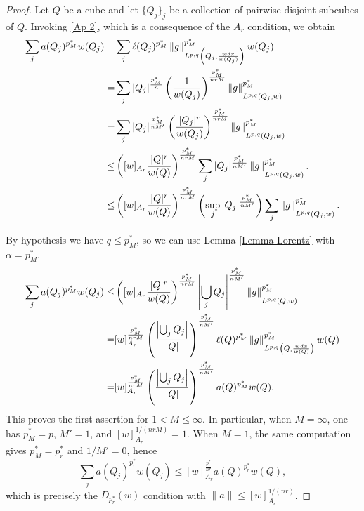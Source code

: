 \documentclass[reqno, 10pt, oneside]{amsart}
\numberwithin{equation}{section}
\newcommand{\strt}[1]{\rule{0pt}{#1}}
\numberwithin{theorem}{section}
\newcommand{\1}{{\rm 1\hspace*{-0.4ex}%
\rule{0.1ex}{1.52ex}\hspace*{0.2ex}}}
\begin{document}
\begin{proof}
Let $Q$ be a cube and let $\{Q_j\}_j$ be a collection of pairwise disjoint subcubes of $Q$. Invoking \eqref{Ap 2}, which is a consequence of the $A_r$ condition, we obtain
		\begin{align*}
			\sum_j a(Q_j)^{p_{M}^*} w(Q_j)  = & \sum_j \ell(Q_j)^{p_{M}^*} \left\| g \right\|_{L^{p,q} \left( Q_j, \frac{wdx}{w(Q_j)}\right)} ^{p_{M}^*} w(Q_j) \\
			= & \sum_j |Q_j|^\frac{p_{M}^*}{n} \left(\frac{1}{w(Q_j)} \right)^{\frac{p_{M}^*}{nrM}} \left\| g \right\|_{\strt{2.3ex} L^{p,q} \left( Q_j, w\right)} ^{p_{M}^*}  \\
			= & \sum_j |Q_j|^{\frac{p_{M}^*}{n M'}}\left(\frac{|Q_j|^r}{w(Q_j)} \right)^{\frac{p_{M}^*}{nrM}} \left\| g \right\|_{\strt{2.3ex} L^{p,q} \left( Q_j, w\right)} ^{p_{M}^*}  \\
			\le & \left([w]_{A_r}\frac{|Q|^r}{w(Q)} \right)^{\frac{p_M^{*}}{nrM}} \sum_j |Q_j|^{\frac{p_{M}^*}{n M'}}\left\| g \right\|_{\strt{2.3ex} L^{p,q} \left( Q_j, w\right)} ^{p_{M}^*}. \\
            \le & \left([w]_{A_r}\frac{|Q|^r}{w(Q)} \right)^{\frac{p_M^{*}}{nrM}} \left( \sup_j |Q_j|^{\frac{p_{M}^*}{n M'}}\right) \sum_j \left\| g \right\|_{\strt{2.3ex} L^{p,q} \left( Q_j, w\right)} ^{p_{M}^*}.
		\end{align*}
		
		By hypothesis we have $q\le p^*_M$, so we can use Lemma \ref{Lemma Lorentz} with $\alpha=p^*_M$,
		\begin{align*}
			\sum_j a(Q_j)^{p_{M}^*} w(Q_j)  \le & \left([w]_{A_r}\frac{|Q|^r}{w(Q)} \right)^{\frac{p_M^{*}}{nrM}} \left| \bigcup_j Q_j\right|^{\frac{p_M^{*}}{n M'}}   \left\| g \right\|_{\strt{2.3ex}L^{p,q} \left( Q, w\right)} ^{p_M^{*}}  \\
			= & [w]_{A_r}^{\frac{p_M^{*}}{nrM}}  \left( \frac{\left| \bigcup_j Q_j\right|}{|Q|} \right)^{\frac{p_M^{*}}{n M'}} \ell(Q)^{p_M^{*}} \left\| g \right\|_{\strt{2.3ex}L^{p,q} \left( Q, \frac{wdx}{w(Q)}\right)}^{p_M^{*}} w(Q)  \\
			= &  [w]_{A_r}^{\frac{p_{M}^*}{nrM}}  \left( \frac{\left| \bigcup_j Q_j\right|}{|Q|} \right)^{\frac{p_{M}^*}{n M'}} a(Q)^{p_{M}^*} w(Q).
		\end{align*}
        This proves the first assertion for $1<M\le\infty$. In particular, when $M=\infty$, one has $p_M^*=p$, $M'=1$, and $[w]_{A_r}^{1/(nrM)}=1$. When $M=1$, the same computation gives $p_M^*=p_r^*$ and $1/M'=0$, hence 
        \begin{equation*}
            \sum_j a(Q_j)^{p_r^*}w(Q_j) \le [w]_{A_r}^{\frac{p_r^*}{nr}} a(Q)^{p_r^*}w(Q),
        \end{equation*}
        which is precisely the $D_{p_r^*}(w)$ condition with $\|a\|\le [w]_{A_r}^{1/(nr)}$.
	\end{proof}
\end{document}
